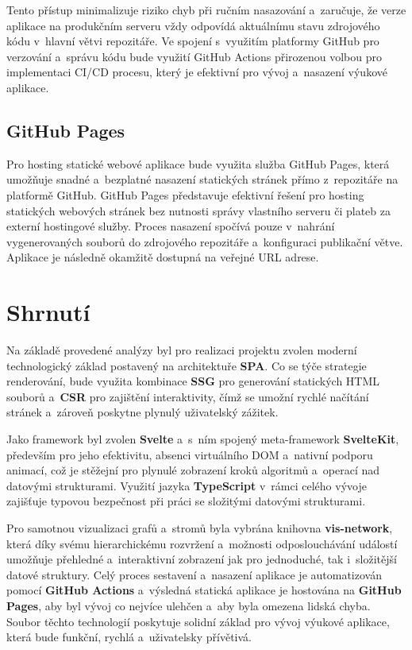 Tento přístup minimalizuje riziko chyb při ručním nasazování a~zaručuje, že verze aplikace na produkčním serveru vždy odpovídá aktuálnímu stavu zdrojového kódu v~hlavní větvi repozitáře.
Ve spojení s~využitím platformy \mbox{GitHub} pro verzování a~správu kódu bude využití \mbox{GitHub} Actions přirozenou volbou pro implementaci CI/CD procesu, který je efektivní pro vývoj a~nasazení výukové aplikace.

\subsection{GitHub Pages}
\label{subsec:github_pages}

Pro hosting statické webové aplikace bude využita služba \mbox{GitHub} Pages, která umožňuje snadné a~bezplatné nasazení statických stránek přímo z~repozitáře na platformě \mbox{GitHub}.
\mbox{GitHub} Pages představuje efektivní řešení pro hosting statických webových stránek bez nutnosti správy vlastního serveru či plateb za externí hostingové služby.
Proces nasazení spočívá pouze v~nahrání vygenerovaných souborů do zdrojového repozitáře a~konfiguraci publikační větve.
Aplikace je následně okamžitě dostupná na veřejné URL adrese.~\cite{pages}

\section{Shrnutí}
\label{sec:tech_summary}

Na základě provedené analýzy byl pro realizaci projektu zvolen moderní technologický základ postavený na architektuře \textbf{SPA}.
Co se týče strategie renderování, bude využita kombinace \textbf{SSG} pro generování statických HTML souborů a~\textbf{CSR} pro zajištění interaktivity, čímž se umožní rychlé načítání stránek a~zároveň poskytne plynulý uživatelský zážitek.

Jako framework byl zvolen \textbf{Svelte} a~s~ním spojený meta-framework \textbf{SvelteKit}, především pro jeho efektivitu, absenci virtuálního DOM a~nativní podporu animací, což je stěžejní pro plynulé zobrazení kroků algoritmů a~operací nad datovými strukturami.
Využití jazyka \textbf{TypeScript} v~rámci celého vývoje zajišťuje typovou bezpečnost při práci se složitými datovými strukturami.

Pro samotnou vizualizaci grafů a~stromů byla vybrána knihovna \textbf{vis-network}, která díky svému hierarchickému rozvržení a~možnosti odposlouchávání událostí umožňuje přehledné a~interaktivní zobrazení jak pro jednoduché, tak i~složitější datové struktury.
Celý proces sestavení a~nasazení aplikace je automatizován pomocí \textbf{\mbox{GitHub} Actions} a~výsledná statická aplikace je hostována na \textbf{\mbox{GitHub} Pages}, aby byl vývoj co nejvíce ulehčen a~aby byla omezena lidská chyba.
Soubor těchto technologií poskytuje solidní základ pro vývoj výukové aplikace, která bude funkční, rychlá a~uživatelsky přívětivá.
